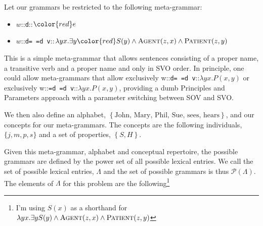 \documentclass[11pt, a4paper]{article}
\newcommand{\lex}[3]{{#1}::{\texttt{#2}}::{$#3$}}
\begin{document}
Let our grammars be restricted to the following meta-grammar:

\begin{itemize}
  \item \lex{$w$}{d}{\color{red}e}
  \item \lex{$w$}{d=~=d~v}{\lambda yx. \exists y {\color{red} S}(y) \land \textsc{Agent}(z,x) \land \textsc{Patient}(z, y)}
\end{itemize}

This is a simple meta-grammar that allows sentences consisting of a proper name, a transitive verb and a proper name and only in SVO order. 
In principle, one could allow meta-grammars that allow exclusively \lex{w}{d= =d v}{\lambda yx. P(x, y)} or exclusively \lex{w}{=d =d v}{\lambda yx. P(x, y)}, providing a dumb Principles and Parameters approach with a parameter switching between SOV and SVO.

We then also define an alphabet, $\left\{\text{John, Mary, Phil, Sue, sees, hears}\right\}$, and our concepts for our meta-grammars.
The concepts are the following individuals, $\{j,m,p,s\}$ and a set of properties, $\left\{S, H\right\}$.

Given this meta-grammar, alphabet and conceptual repertoire, the possible grammars are defined by the power set of all possible lexical entries. 
We call the set of possible lexical entries, $\Lambda$ and the set of possible grammars is thus $\mathcal{P}(\Lambda)$.
The elements of $\Lambda$ for this problem are the following\footnote{I'm using $S(x)$ as a shorthand for $\lambda yx. \exists y S(y) \land \textsc{Agent}(z,x) \land \textsc{Patient}(z, y)$}
\end{document}
